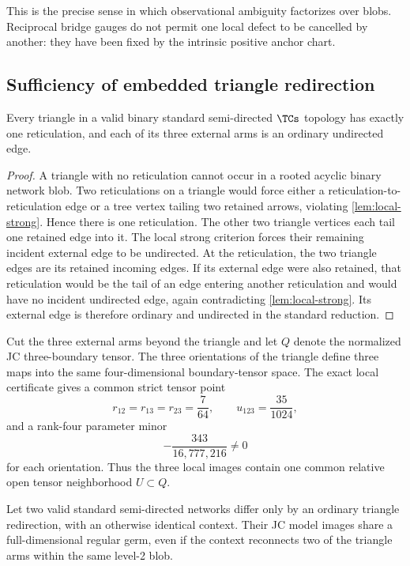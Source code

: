 This is the precise sense in which observational ambiguity factorizes over blobs.  Reciprocal bridge gauges do not permit one local defect to be cancelled by another: they have been fixed by the intrinsic positive anchor chart.

\subsection{Sufficiency of embedded triangle redirection}\label{sec:embedded-T}

\begin{lemma}\label{lem:triangle-arms}
Every triangle in a valid binary standard semi-directed $\TCs$ topology has exactly one reticulation, and each of its three external arms is an ordinary undirected edge.
\end{lemma}

\begin{proof}
A triangle with no reticulation cannot occur in a rooted acyclic binary network blob.  Two reticulations on a triangle would force either a reticulation-to-reticulation edge or a tree vertex tailing two retained arrows, violating \cref{lem:local-strong}.  Hence there is one reticulation.  The other two triangle vertices each tail one retained edge into it.  The local strong criterion forces their remaining incident external edge to be undirected.  At the reticulation, the two triangle edges are its retained incoming edges.  If its external edge were also retained, that reticulation would be the tail of an edge entering another reticulation and would have no incident undirected edge, again contradicting \cref{lem:local-strong}.  Its external edge is therefore ordinary and undirected in the standard reduction.
\end{proof}

Cut the three external arms beyond the triangle and let $Q$ denote the normalized JC three-boundary tensor.  The three orientations of the triangle define three maps into the same four-dimensional boundary-tensor space.  The exact local certificate gives a common strict tensor point
\[
r_{12}=r_{13}=r_{23}=\frac7{64},
\qquad
u_{123}=\frac{35}{1024},
\]
and a rank-four parameter minor
\[
-\frac{343}{16{,}777{,}216}\ne0
\]
for each orientation.  Thus the three local images contain one common relative open tensor neighborhood $U\subset Q$.

\begin{proposition}\label{prop:T-context}
Let two valid standard semi-directed networks differ only by an ordinary triangle redirection, with an otherwise identical context.  Their JC model images share a full-dimensional regular germ, even if the context reconnects two of the triangle arms within the same level-2 blob.
\end{proposition}

